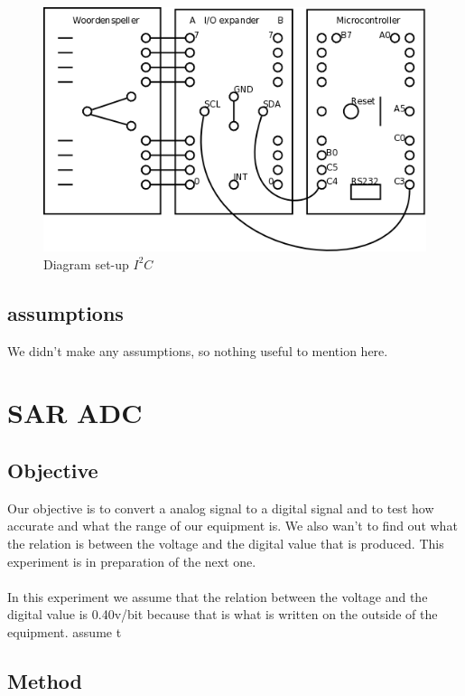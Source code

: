 \documentclass[a4paper, 12pt, titlepage]{article}
\begin{document}
\begin{figure}[H]
\caption{Diagram set-up $I^{2}C$}
\includegraphics[scale=0.61]{I2C.png}
\end{figure}


\subsection{assumptions} %

We didn't make any assumptions, so nothing useful to mention here.
\newpage
\section{SAR ADC} %

\subsection{Objective} %
Our objective is to convert a analog signal to a digital signal and 
to test how accurate and what the range of our equipment is. We also wan't to find out what the relation is between the voltage and the digital value that is produced. This experiment is in preparation of the next one. \\
\\
In this experiment we assume that the relation between the voltage and the digital value is 0.40v/bit because that is what is written on the outside of the equipment.
assume t

\subsection{Method} %
\end{document}
